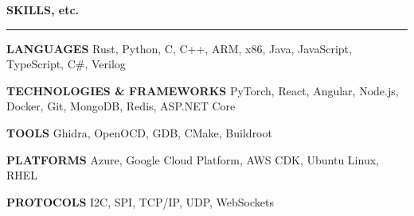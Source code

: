 \documentclass[notitlepage,10pt,a4paper]{article}
\newenvironment{resumesection}[1]{
    \header{#1}
}{}
\newcommand{\labela}[1]{
    \small\textbf{\MakeUppercase{#1}}
}
\newcommand{\header}[1]{
    \vspace{2pt}
    \textcolor{accent1}{\Large \textbf{#1}}
    \vspace{6pt}\hrule\vspace{4pt}
}
\newcommand{\emptyheader}{
    \hrule\vspace{4pt}
}
\newcommand{\thingsep}{
    \vspace{4pt}
}
\begin{document}
\begin{resumesection}{SKILLS, etc.}
    \labela{Languages} Rust, Python, C, C++, ARM, x86, Java, JavaScript, TypeScript, C\#, Verilog

    \labela{Technologies \& Frameworks} PyTorch, React, Angular, Node.js, Docker, Git, MongoDB, Redis, ASP.NET Core

    \labela{Tools} Ghidra, OpenOCD, GDB, CMake, Buildroot

    \labela{Platforms} Azure, Google Cloud Platform, AWS CDK, Ubuntu Linux, RHEL

    \labela{Protocols} I2C, SPI, TCP/IP, UDP, WebSockets

\end{resumesection}










\vspace*{\fill}
\end{document}

